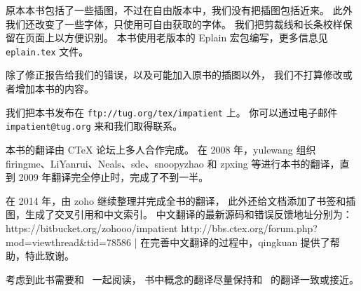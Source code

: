 原本本书包括了一些插图，不过在自由版本中，我们没有把插图包括近来。
此外我们还改变了一些字体，只使用可自由获取的字体。
我们把剪裁线和长条校样保留在页面上以方便识别。
本书使用老版本的 Eplain 宏包编写，更多信息见 {\tt eplain.tex} 文件。

除了修正报告给我们的错误，以及可能加入原书的插图以外，
我们不打算修改或者增加本书的内容。

我们把本书发布在 {\tt ftp://tug.org/tex/impatient} 上。
你可以通过电子邮件 {\tt impatient@tug.org} 来和我们取得联系。

\baselineskip

本书的翻译由 CTeX 论坛上多人合作完成。
在 2008 年，yulewang 组织 firingme、LiYanrui、Neals、sde、snoopyzhao
和 zpxing 等进行本书的翻译，直到 2009 年翻译完全停止时，完成了不到一半。

在 2014 年，由 zoho 继续整理并完成全书的翻译，
此外还给文档添加了书签和插图，生成了交叉引用和中文索引。
中文翻译的最新源码和错误反馈地址分别为：
\csdisplay
https://bitbucket.org/zohooo/impatient
http://bbs.ctex.org/forum.php?mod=viewthread&tid=78586
|
在完善中文翻译的过程中，qingkuan 提供了帮助，特此致谢。

考虑到此书需要和 \texbook\ 一起阅读，
书中概念的翻译尽量保持和 \texbook\ 的翻译一致或接近。

\pagebreak
\byebye
